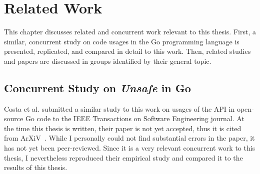 
\chapter{Related Work}\label{ch:related-work}

This chapter discusses related and concurrent work relevant to this thesis.
First, a similar, concurrent study on \unsafe{} code usages in the Go programming language is presented, replicated, and
compared in detail to this work.
Then, related studies and papers are discussed in groups identified by their general topic.



\section{Concurrent Study on \textit{Unsafe} in Go}\label{sec:related-work:concurrent-study}

Costa et al. submitted a similar study to this work on usages of the \unsafe{} \acrshort{API} in open-source Go code to
the IEEE Transactions on Software Engineering journal.
At the time this thesis is written, their paper is not yet accepted, thus it is cited from ArXiV~\cite{costa2020}.
While I personally could not find substantial errors in the paper, it has not yet been peer-reviewed.
Since it is a very relevant concurrent work to this thesis, I nevertheless reproduced their empirical study and compared
it to the results of this thesis.

